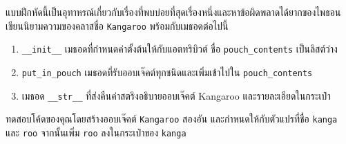 \begin{exercise}
\label{kangaroo}



แบบฝึกหัดนี้เป็นอุทาหรณ์เกี่ยวกับเรื่องที่พบบ่อยที่สุดเรื่องหนึ่งและหาข้อผิดพลาดได้ยากของไพธอน
เขียนนิยามความของคลาสชื่อ {\tt Kangaroo} พร้อมกับเมธอดต่อไปนี้

\begin{enumerate}


\item  \verb"__init__" เมธอดที่กำหนดค่าตั้งต้นให้กับแอตทริบิวต์ ชื่อ \verb"pouch_contents" เป็นลิสต์ว่าง


\item \verb"put_in_pouch" เมธอดที่รับออบเจ๊คต์ทุกชนิดและเพิ่มเข้าไปใน \verb"pouch_contents"


\item เมธอด \verb"__str__" ที่ส่งคืนค่าสตริงอธิบายออบเจ๊คต์ Kangaroo และรายละเอียดในกระเป๋า

\end{enumerate}
%

ทดสอบโค้ดของคุณโดยสร้างออบเจ๊คต์ {\tt Kangaroo} สองอัน และกำหนดให้กับตัวแปรที่ชื่อ {\tt kanga} และ {\tt roo} 
จากนั้นเพิ่ม {\tt roo} ลงในกระเป๋าของ {\tt kanga}


\end{exercise}

